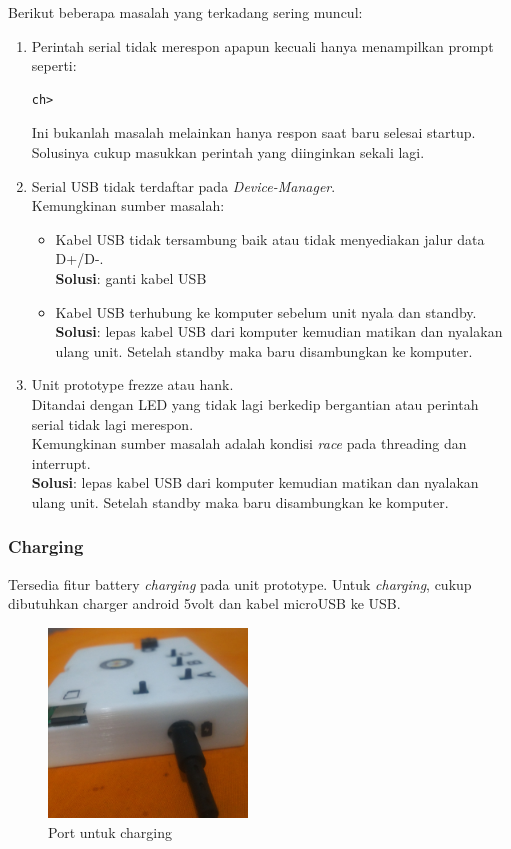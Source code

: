 \documentclass[12pt,]{article}
\begin{document}
	Berikut beberapa masalah yang terkadang sering muncul:
	\begin{enumerate}
		\item Perintah serial tidak merespon apapun kecuali hanya menampilkan prompt seperti:
		\begin{verbatim}
ch>
		\end{verbatim}
		Ini bukanlah masalah melainkan hanya respon saat baru selesai startup.
		Solusinya cukup masukkan perintah yang diinginkan sekali lagi.
		
		\item Serial USB tidak terdaftar pada \textit{Device-Manager}.\\
		Kemungkinan sumber masalah:
		\begin{itemize}
			\item Kabel USB tidak tersambung baik atau tidak menyediakan jalur data D+/D-.\\
			\textbf{Solusi}: ganti kabel USB
			
			\item Kabel USB terhubung ke komputer sebelum unit nyala dan standby.\\
			\textbf{Solusi}: lepas kabel USB dari komputer kemudian matikan dan nyalakan ulang unit.
			Setelah standby maka baru disambungkan ke komputer.
		\end{itemize}
	
		\item Unit prototype frezze atau hank.\\
		Ditandai dengan LED yang tidak lagi berkedip bergantian atau perintah serial tidak lagi merespon.\\
		Kemungkinan sumber masalah adalah kondisi \textit{race} pada threading dan interrupt.\\
		\textbf{Solusi}: lepas kabel USB dari komputer kemudian matikan dan nyalakan ulang unit.
		Setelah standby maka baru disambungkan ke komputer.
	\end{enumerate}

	\subsubsection{Charging}
	
	Tersedia fitur battery \textit{charging} pada unit prototype.
	Untuk \textit{charging}, cukup dibutuhkan charger android 5volt dan kabel microUSB ke USB.
	\begin{figure}[!ht]
		\centering
		\includegraphics[width=150pt]{images/foto/charging}
		\caption{Port untuk charging}
	\end{figure}
\end{document}
